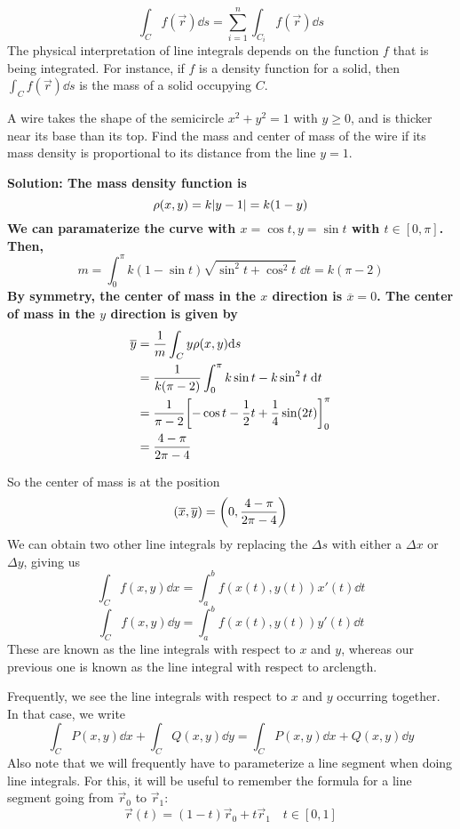 \[ \int_C f(\vec r)\dd s = \sum_{i=1}^n \int_{C_i}f(\vec r)\dd s \]
The physical interpretation of line integrals depends on the function $f$ that is being integrated. For instance, if $f$ is a density function for a solid, then $\int_Cf(\vec r)\dd s$ is the mass of a solid occupying $C$.
\begin{example}
    A wire takes the shape of the semicircle $x^2+y^2=1$ with $y\geq 0$, and is thicker near its base than its top. Find the mass and center of mass of the wire if its mass density is proportional to its distance from the line $y=1$. \par
    \bf{Solution:} The mass density function is
    \[ \rho(x,y) = k\abs{y-1} = k(1-y) \]
    We can paramaterize the curve with $x=\cos t, y=\sin t$ with $t\in[0, \pi]$. Then, 
    \[ m = \int_0^\pi k(1-\sin t)\sqrt{\sin^2t + \cos^2t}\; \dd t = k(\pi - 2) \]
    By symmetry, the center of mass in the $x$ direction is $\overline x=0$. The center of mass in the $y$ direction is given by
    \begin{align*}
        \overline y &= \frac{1}{m} \int_C y\rho(x,y)\dd s \\
        &= \frac{1}{k(\pi -2)}\int_0^\pi k\sin t-k\sin^2t\;\dd t \\
        &= \frac{1}{\pi-2}\bqty{-\cos t - \frac{1}{2}t + \frac{1}{4}\sin(2t)}_0^\pi \\
        &= \frac{4-\pi}{2\pi-4}
    \end{align*}
\end{example}
So the center of mass is at the position
\[ (\overline x, \overline y) = \pqty{0, \frac{4-\pi}{2\pi -4}}\]
We can obtain two other line integrals by replacing the $\Delta s$ with either a $\Delta x$ or $\Delta y$, giving us
\[ \int_C f(x,y)\dd x = \int_a^b f(x(t), y(t))x'(t)\dd t\]
\[ \int_C f(x,y)\dd y = \int_a^b f(x(t),y(t))y'(t)\dd t \]
These are known as the line integrals with respect to $x$ and $y$, whereas our previous one is known as the line integral with respect to arclength. \par
Frequently, we see the line integrals with respect to $x$ and $y$ occurring together. In that case, we write
\[ \int_C P(x,y)\dd x + \int_C Q(x,y)\dd y = \int_C P(x,y)\dd x + Q(x,y)\dd y\]
Also note that we will frequently have to parameterize a line segment when doing line integrals. For this, it will be useful to remember the formula for a line segment going from $\vec r_0$ to $\vec r_1$:
\[ \vec r(t) = (1-t)\vec r_0 + t\vec r_1 \quad t\in[0,1]\]
